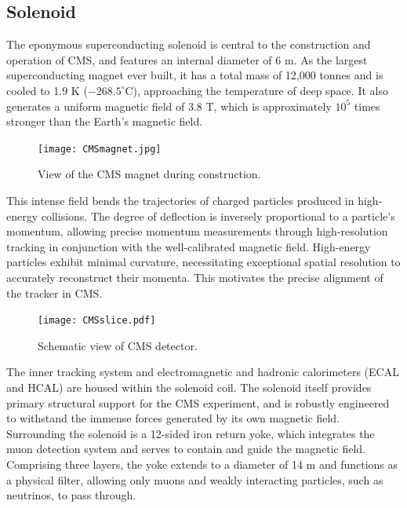 \subsection{Solenoid}
The eponymous superconducting solenoid is central to the construction and operation of CMS, and features an internal diameter of 6 m. As the largest superconducting magnet ever built, it has a total mass of 12,000 tonnes and is cooled to 1.9 K ($-268.5^\circ$C), approaching the temperature of deep space. It also generates a uniform magnetic field of 3.8 T, which is approximately $10^5$ times stronger than the Earth's magnetic field.

\begin{figure}[!hbt]
    \begin{center}
        \texttt{[image: CMSmagnet.jpg]}
        \caption{View of the CMS magnet during construction.}
        \label{fig:CMSmagnet}
    \end{center}
\end{figure}

This intense field bends the trajectories of charged particles produced in high-energy collisions. The degree of deflection is inversely proportional to a particle’s momentum, allowing precise momentum measurements through high-resolution tracking in conjunction with the well-calibrated magnetic field. High-energy particles exhibit minimal curvature, necessitating exceptional spatial resolution to accurately reconstruct their momenta. This motivates the precise alignment of the tracker in CMS. 

\begin{figure}[!hbt]
    \begin{center}
        \texttt{[image: CMSslice.pdf]}
        \caption{Schematic view of CMS detector.}
        \label{fig:cmscutaway2}
    \end{center}
\end{figure}

The inner tracking system and electromagnetic and hadronic calorimeters (ECAL and HCAL) are housed within the solenoid coil. The solenoid itself provides primary structural support for the CMS experiment, and is robustly engineered to withstand the immense forces generated by its own magnetic field. Surrounding the solenoid is a 12-sided iron return yoke, which integrates the muon detection system and serves to contain and guide the magnetic field. Comprising three layers, the yoke extends to a diameter of 14 m and functions as a physical filter, allowing only muons and weakly interacting particles, such as neutrinos, to pass through. 

